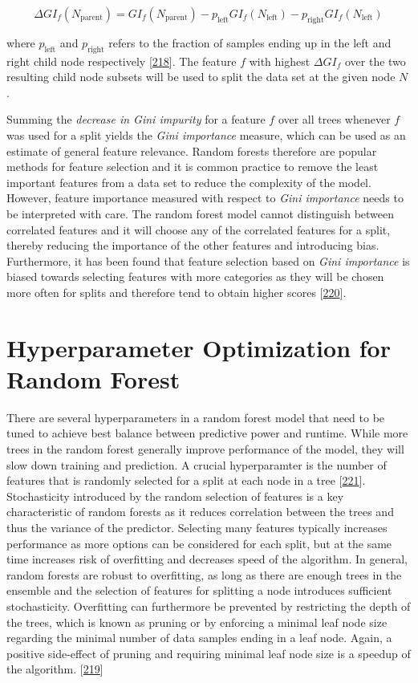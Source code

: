 \documentclass[11pt,a4paper,twoside]{book}
\theoremstyle{definition}
\theoremstyle{definition}
\theoremstyle{remark}
\begin{document}
\[
\Delta GI_f(N_{\textrm{parent}}) = GI_f(N_{\textrm{parent}}) - p_{\textrm{left}} GI_f(N_{\textrm{left}}) - p_{\textrm{right}} GI_f(N_{\textrm{left}})
\]

where \(p_{\textrm{left}}\) and \(p_{\textrm{right}}\) refers to the
fraction of samples ending up in the left and right child node
respectively {[}\protect\hyperlink{ref-Menze2009}{218}{]}. The feature
\(f\) with highest \(\Delta GI_f\) over the two resulting child node
subsets will be used to split the data set at the given node \(N\).

Summing the \emph{decrease in Gini impurity} for a feature \(f\) over
all trees whenever \(f\) was used for a split yields the \emph{Gini
importance} measure, which can be used as an estimate of general feature
relevance. Random forests therefore are popular methods for feature
selection and it is common practice to remove the least important
features from a data set to reduce the complexity of the model. However,
feature importance measured with respect to \emph{Gini importance} needs
to be interpreted with care. The random forest model cannot distinguish
between correlated features and it will choose any of the correlated
features for a split, thereby reducing the importance of the other
features and introducing bias. Furthermore, it has been found that
feature selection based on \emph{Gini importance} is biased towards
selecting features with more categories as they will be chosen more
often for splits and therefore tend to obtain higher scores
{[}\protect\hyperlink{ref-Strobl2007}{220}{]}.

\section{Hyperparameter Optimization for Random
Forest}\label{hyperparameter-optimization-for-random-forest}

There are several hyperparameters in a random forest model that need to
be tuned to achieve best balance between predictive power and runtime.
While more trees in the random forest generally improve performance of
the model, they will slow down training and prediction. A crucial
hyperparamter is the number of features that is randomly selected for a
split at each node in a tree
{[}\protect\hyperlink{ref-Bernard2009}{221}{]}. Stochasticity introduced
by the random selection of features is a key characteristic of random
forests as it reduces correlation between the trees and thus the
variance of the predictor. Selecting many features typically increases
performance as more options can be considered for each split, but at the
same time increases risk of overfitting and decreases speed of the
algorithm. In general, random forests are robust to overfitting, as long
as there are enough trees in the ensemble and the selection of features
for splitting a node introduces sufficient stochasticity. Overfitting
can furthermore be prevented by restricting the depth of the trees,
which is known as pruning or by enforcing a minimal leaf node size
regarding the minimal number of data samples ending in a leaf node.
Again, a positive side-effect of pruning and requiring minimal leaf node
size is a speedup of the algorithm.
{[}\protect\hyperlink{ref-Louppe2014}{219}{]}
\end{document}
